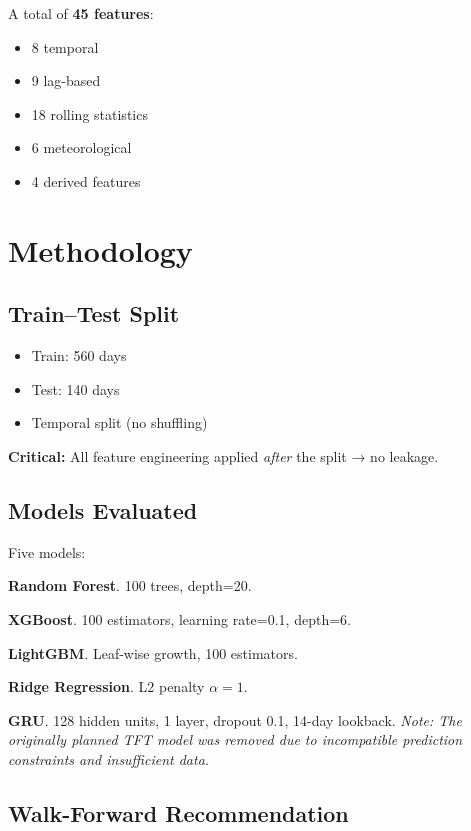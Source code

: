\documentclass[11pt,a4paper]{article}
\begin{document}
A total of \textbf{45 features}:
\begin{itemize}
    \item 8 temporal
    \item 9 lag-based
    \item 18 rolling statistics
    \item 6 meteorological
    \item 4 derived features
\end{itemize}

\section{Methodology}

\subsection{Train–Test Split}

\begin{itemize}
    \item Train: 560 days
    \item Test: 140 days
    \item Temporal split (no shuffling)
\end{itemize}

\textbf{Critical:} All feature engineering applied \emph{after} the split → no leakage.

\subsection{Models Evaluated}

Five models:

\textbf{Random Forest}.  
100 trees, depth=20.

\textbf{XGBoost}.  
100 estimators, learning rate=0.1, depth=6.

\textbf{LightGBM}.  
Leaf-wise growth, 100 estimators.

\textbf{Ridge Regression}.  
L2 penalty $\alpha=1$.

\textbf{GRU}.  
128 hidden units, 1 layer, dropout 0.1, 14-day lookback.  
\textit{Note: The originally planned TFT model was removed due to incompatible prediction constraints and insufficient data.}

\subsection{Walk-Forward Recommendation}
\end{document}
